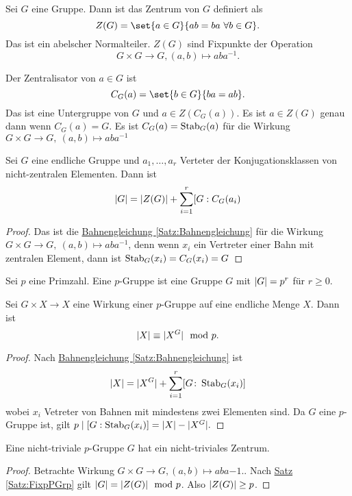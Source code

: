 \begin{Def}
    Sei \(G\) eine Gruppe. Dann ist das Zentrum von \(G\) definiert als
    \[Z(G)=\set{a\in G}{ab=ba\ \forall b\in G}.\] Das ist ein abelscher Normalteiler. \(Z(G)\) sind Fixpunkte der Operation \[G\times G\to G, (a,b)\mapsto aba^{-1}.\]
\end{Def}
\begin{Def}
    Der Zentralisator von \(a\in G\) ist \[C_G(a)=\set{b\in G}{ba=ab}.\] Das ist eine Untergruppe von \(G\) und \(a\in Z(C_G(a))\). Es ist \(a\in Z(G)\) genau dann wenn \(C_G(a)=G\). Es ist \(C_G(a)=\operatorname{Stab}_G(a)\) für die Wirkung \(G\times G\to G,\ (a,b)\mapsto aba^{-1}\)
\end{Def}
\begin{Satz}[Klassengleichung]\label{Satz:Klassengleichung}
    Sei \(G\) eine endliche Gruppe und \(a_1,\dots,a_r\) Verteter der Konjugationsklassen von nicht-zentralen Elementen. Dann ist 
    \[\lvert G\rvert=\lvert Z(G)\rvert+\sum_{i=1}^r[G:C_G(a_i)\]
\end{Satz}
\begin{proof}
    Das ist die \hyperref[Satz:Bahnengleichung]{Bahnengleichung \ref{Satz:Bahnengleichung}} für die Wirkung \(G\times G\to G,\ (a,b)\mapsto aba^{-1}\), denn wenn \(x_i\) ein Vertreter einer Bahn mit zentralen Element, dann ist \(\operatorname{Stab}_G(x_i)=C_G(x_i)=G\)
\end{proof}
\begin{Def}
    Sei \(p\) eine Primzahl. Eine \(p\)-Gruppe ist eine Gruppe \(G\) mit \(\lvert G\rvert=p^r\) für \(r\geq 0\). 
\end{Def}
\begin{Satz}\label{Satz:FixpPGrp}
    Sei \(G\times X\to X\) eine Wirkung einer \(p\)-Gruppe auf eine endliche Menge \(X\). Dann ist 
    \[\lvert X\rvert\equiv \lvert X^G\rvert\mod p.\]
\end{Satz}
\begin{proof}
    Nach \hyperref[Satz:Bahnengleichung]{Bahnengleichung \ref{Satz:Bahnengleichung}} ist 
    \[\lvert X\rvert=\lvert X^G\rvert+\sum_{i=1}^r[G\colon \operatorname{Stab}_G(x_i)]\] wobei \(x_i\) Vetreter von Bahnen mit mindestens zwei Elementen sind. Da \(G\) eine \(p\)-Gruppe ist, gilt 
    \(p\mid [G:\operatorname{Stab}_G(x_i)]=\lvert X\rvert-\lvert X^G\rvert.\)
\end{proof}
\begin{Satz}\label{Satz:pGrpZentrum}
    Eine nicht-triviale \(p\)-Gruppe \(G\) hat ein nicht-triviales Zentrum.
\end{Satz}
\begin{proof}
    Betrachte Wirkung \(G\times G\to G, (a,b)\mapsto aba{-1}.\). Nach \hyperref[Satz:FixpPGrp]{ Satz \ref{Satz:FixpPGrp}} gilt \(\lvert G\rvert=\lvert Z(G)\rvert\mod p\). Also \(\lvert Z(G)\rvert\geq p\).
\end{proof}

